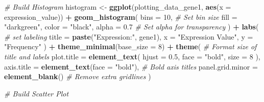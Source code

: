 \documentclass[
]{article}
\newenvironment{Shaded}{\begin{snugshade}}{\end{snugshade}}
\newcommand{\AttributeTok}[1]{\textcolor[rgb]{0.13,0.29,0.53}{#1}}
\newcommand{\CommentTok}[1]{\textcolor[rgb]{0.56,0.35,0.01}{\textit{#1}}}
\newcommand{\DecValTok}[1]{\textcolor[rgb]{0.00,0.00,0.81}{#1}}
\newcommand{\FloatTok}[1]{\textcolor[rgb]{0.00,0.00,0.81}{#1}}
\newcommand{\FunctionTok}[1]{\textcolor[rgb]{0.13,0.29,0.53}{\textbf{#1}}}
\newcommand{\NormalTok}[1]{#1}
\newcommand{\OtherTok}[1]{\textcolor[rgb]{0.56,0.35,0.01}{#1}}
\newcommand{\SpecialCharTok}[1]{\textcolor[rgb]{0.81,0.36,0.00}{\textbf{#1}}}
\newcommand{\StringTok}[1]{\textcolor[rgb]{0.31,0.60,0.02}{#1}}
\begin{document}
\begin{Shaded}
\begin{Highlighting}[]
  \CommentTok{\# Build Histogram}
\NormalTok{  histogram }\OtherTok{\textless{}{-}} \FunctionTok{ggplot}\NormalTok{(plotting\_data\_gene1, }\FunctionTok{aes}\NormalTok{(}\AttributeTok{x =}\NormalTok{ expression\_value)) }\SpecialCharTok{+} 
    \FunctionTok{geom\_histogram}\NormalTok{(}
      \AttributeTok{bins =} \DecValTok{10}\NormalTok{, }\CommentTok{\# Set bin size}
      \AttributeTok{fill =} \StringTok{"darkgreen"}\NormalTok{,}
      \AttributeTok{color =} \StringTok{"black"}\NormalTok{,}
      \AttributeTok{alpha =} \FloatTok{0.7} \CommentTok{\# Set alpha for transparency}
\NormalTok{    ) }\SpecialCharTok{+}
    \FunctionTok{labs}\NormalTok{( }\CommentTok{\# set labeling}
      \AttributeTok{title =} \FunctionTok{paste}\NormalTok{(}\StringTok{"Expression:"}\NormalTok{, gene1),}
      \AttributeTok{x =} \StringTok{"Expression Value"}\NormalTok{,}
      \AttributeTok{y =} \StringTok{"Frequency"}
\NormalTok{    ) }\SpecialCharTok{+}
   \FunctionTok{theme\_minimal}\NormalTok{(}\AttributeTok{base\_size =} \DecValTok{8}\NormalTok{) }\SpecialCharTok{+}
    \FunctionTok{theme}\NormalTok{( }\CommentTok{\# Format size of title and labels}
      \AttributeTok{plot.title =} \FunctionTok{element\_text}\NormalTok{(}
        \AttributeTok{hjust =} \FloatTok{0.5}\NormalTok{,}
        \AttributeTok{face =} \StringTok{"bold"}\NormalTok{,}
        \AttributeTok{size =} \DecValTok{8}
\NormalTok{      ),}
      \AttributeTok{axis.title =} \FunctionTok{element\_text}\NormalTok{(}\AttributeTok{face =} \StringTok{"bold"}\NormalTok{), }\CommentTok{\# Bold axis titles}
      \AttributeTok{panel.grid.minor =} \FunctionTok{element\_blank}\NormalTok{() }\CommentTok{\# Remove extra gridlines}
\NormalTok{  )}
  
  \CommentTok{\# Build Scatter Plot}
  

\end{Highlighting}
\end{Shaded}
\end{document}
